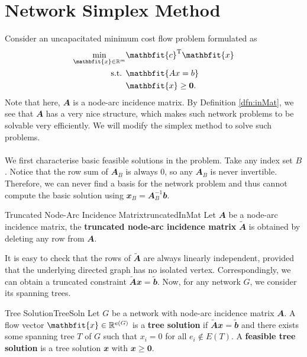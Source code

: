 \documentclass[math, code]{amznotes}
\theoremstyle{remark}
\begin{document}
\section{Network Simplex Method}
Consider an uncapacitated minimum cost flow problem formulated as
\begin{align*}
    \min_{\mathbfit{x} \in \R^m} & \mathbfit{c}^{\mathrm{T}}\mathbfit{x} \\
    \textrm{s.t. } & \mathbfit{Ax = b} \\
    & \mathbfit{x} \geq \mathbf{0}.
\end{align*}
Note that here, $\mathbfit{A}$ is a node-arc incidence matrix. By Definition \ref{dfn:inMat}, we see that $\mathbfit{A}$ has a very nice structure, which makes such network problems to be solvable very efficiently. We will modify the simplex method to solve such problems.
\\\\
We first characterise basic feasible solutions in the problem. Take any index set $B$. Notice that the row sum of $\mathbfit{A}_B$ is always $\mathbfit{0}$, so any $\mathbfit{A}_B$ is never invertible. Therefore, we can never find a basis for the network problem and thus cannot compute the basic solution using $\mathbfit{x}_B = \mathbfit{A}_B^{-1}\mathbfit{b}$.
\begin{dfnbox}{Truncated Node-Arc Incidence Matrix}{truncatedInMat}
    Let $\mathbfit{A}$ be a node-arc incidence matrix, the {\color{red} \textbf{truncated node-arc incidence matrix}} $\tilde{\mathbfit{A}}$ is obtained by deleting any row from $\mathbfit{A}$.
\end{dfnbox}
It is easy to check that the rows of $\tilde{\mathbfit{A}}$ are always linearly independent, provided that the underlying directed graph has no isolated vertex. Correspondingly, we can obtain a truncated constraint $\tilde{\mathbfit{A}}\mathbfit{x} = \tilde{\mathbfit{b}}$. Now, for any network $G$, we consider its spanning trees.
\begin{dfnbox}{Tree Solution}{TreeSoln}
    Let $G$ be a network with node-arc incidence matrix $\mathbfit{A}$. A flow vector $\mathbfit{x} \in \R^{e(G)}$ is a {\color{red} \textbf{tree solution}} if $\tilde{\mathbfit{A}}\mathbfit{x} = \tilde{\mathbfit{b}}$ and there exists some spanning tree $T$ of $G$ such that $x_i = 0$ for all $e_i \notin E(T)$. A {\color{red} \textbf{feasible tree solution}} is a tree solution $\mathbfit{x}$ with $\mathbfit{x} \geq \mathbf{0}$.
\end{dfnbox}
\end{document}
